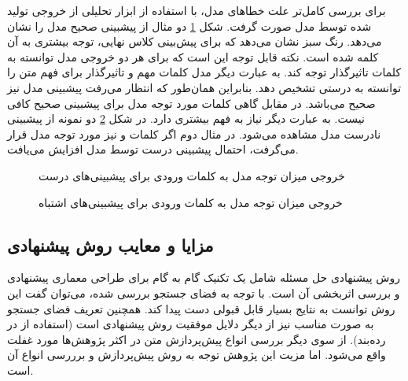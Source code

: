 برای بررسی کامل‌تر علت خطاهای مدل، با استفاده از ابزار
 
تحلیلی از خروجی تولید شده توسط مدل صورت گرفت. شکل
\ref{error-analysis}
دو مثال از پیشبینی صحیح مدل را نشان می‌دهد. رنگ سبز نشان‌ می‌دهد که برای پیش‌بینی کلاس نهایی، توجه بیشتری به آن کلمه شده است. نکته قابل توجه این است که برای هر دو خروجی مدل توانسته به کلمات تاثیرگذار توجه کند. به عبارت دیگر مدل کلمات مهم و تاثیرگذار برای فهم متن را توانسته به درستی تشخیص دهد. بنابراین همان‌طور که انتظار می‌رفت پیشبینی مدل نیز صحیح می‌باشد.  در مقابل گاهی کلمات مورد توجه مدل برای پیشبینی صحیح کافی نیست. به عبارت دیگر نیاز به فهم بیشتری دارد. در شکل
\ref{error-analysis-wrong-answers}
دو نمونه از پیشبینی نادرست مدل مشاهده می‌شود. در مثال دوم اگر کلمات
و 
نیز مورد توجه مدل قرار می‌گرفت، احتمال پیشبینی درست توسط مدل افزایش می‌یافت.

\begin{figure}[H]
    \vspace{-1cm}
	\caption{خروجی میزان توجه مدل به کلمات ورودی برای پیشبینی‌های درست}
	\label{error-analysis}
\end{figure}

\begin{figure}[H]
	\vspace{-1cm}
	\caption{خروجی میزان توجه مدل به کلمات ورودی برای پیشبینی‌های اشتباه}
	\label{error-analysis-wrong-answers}
\end{figure}


\subsection{مزایا و معایب روش پیشنهادی}
روش پیشنهادی حل مسئله شامل یک تکنیک گام به گام برای طراحی معماری پیشنهادی و بررسی اثربخشی آن است. با توجه به فضای جستجو بررسی شده، می‌توان گفت این روش توانست به نتایج بسیار قابل قبولی دست پیدا کند. همچنین تعریف فضای جستجو به صورت مناسب نیز از دیگر دلایل موفقیت روش پیشنهادی است (استفاده از 
در رده‌بند). از سوی دیگر بررسی انواع پیش‌پردازش متن در اکثر پژوهش‌ها مورد غفلت واقع می‌شود. اما مزیت این پژوهش توجه به روش پیش‌پردازش و برررسی انواع آن است.

